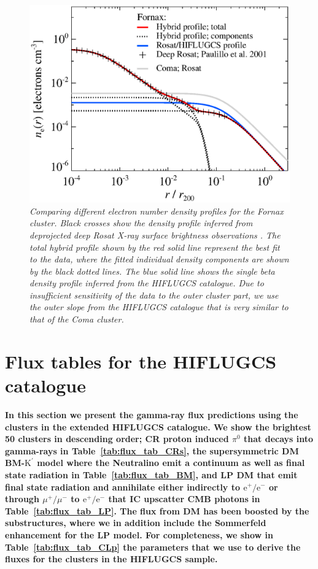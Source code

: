 \documentclass[10pt,aps,pra,reprint,amsmath,amsfonts,amssymb,showpacs,nofootinbib,floatfix]{revtex4-1}
\def\C#1{{\bf #1}}
\newcommand{\rmn}{\mathrm}
\newcommand{\Kp}{\rmn{K}^\prime}
\begin{document}
\begin{figure}%
 \includegraphics[width=0.99\columnwidth]{figures/dens.fornax.eps}
 \caption{\it Comparing different electron number density profiles for
   the Fornax cluster. Black crosses show the density profile inferred
   from deprojected deep Rosat X-ray surface brightness observations
   \protect \cite{2002ApJ...565..883P}. The total hybrid profile shown
   by the red solid line represent the best fit to the data, where the
   fitted individual density components are shown by the black dotted
   lines. The blue solid line shows the single beta density profile
   inferred from the HIFLUGCS catalogue. Due to insufficient
   sensitivity of the data to the outer cluster part, we use the outer
   slope from the HIFLUGCS catalogue that is very similar to that of
   the Coma cluster.}
 \label{fig:dens_fornax}
\end{figure}


\section{Flux tables for the HIFLUGCS catalogue}

\C{In this section we present the gamma-ray flux predictions using the
  clusters in the extended HIFLUGCS catalogue. We show the brightest
  50 clusters in descending order; CR proton induced $\pi^0$ that
  decays into gamma-rays in Table~\ref{tab:flux_tab_CRs}, the
  supersymmetric DM BM-$\Kp$ model where the Neutralino emit a
  continuum as well as final state radiation in
  Table~\ref{tab:flux_tab_BM}, and LP DM that emit final state
  radiation and annihilate either indirectly to $\rmn{e}^+/\rmn{e}^-$
  or through $\mu^+/\mu^-$ to $\rmn{e}^+/\rmn{e}^-$ that IC upscatter
  CMB photons in Table~\ref{tab:flux_tab_LP}. The flux from DM has
  been boosted by the substructures, where we in addition include the
  Sommerfeld enhancement for the LP model. For completeness, we show
  in Table~\ref{tab:flux_tab_CLp} the parameters that we use to derive
  the fluxes for the clusters in the HIFLUGCS sample.}
\end{document}
